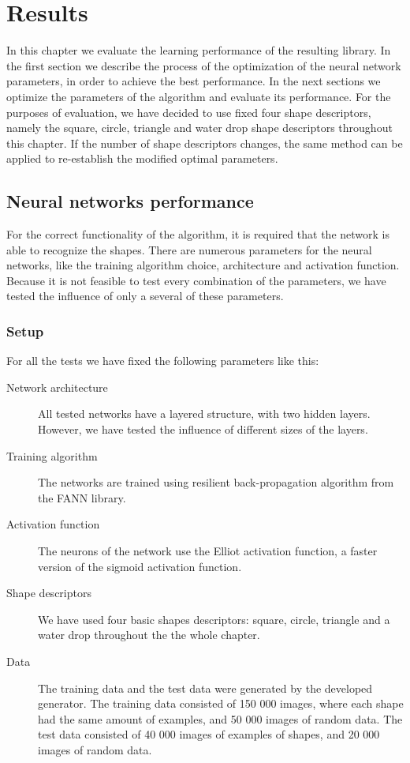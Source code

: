 \chapter{Results}
In this chapter we evaluate the learning performance of the resulting library. In the first section we describe the process of the optimization of the neural network parameters, in order to achieve the best performance. In the next sections we optimize the parameters of the algorithm and evaluate its performance. For the purposes of evaluation, we have decided to use fixed four shape descriptors, namely the square, circle, triangle and water drop shape descriptors throughout this chapter. If the number of shape descriptors changes, the same method can be applied to re-establish the modified optimal parameters.

\section{Neural networks performance}
For the correct functionality of the algorithm, it is required that the network is able to recognize the shapes. There are numerous parameters for the neural networks, like the training algorithm choice, architecture and activation function. Because it is not feasible to test every combination of the parameters, we have tested the influence of only a several of these parameters.

\subsection{Setup}
For all the tests we have fixed the following parameters like this:
\begin{description}
\item [Network architecture] All tested networks have a layered structure, with two hidden layers. However, we have tested the influence of different sizes of the layers.
\item [Training algorithm] The networks are trained using resilient back-propagation algorithm from the FANN library.
\item [Activation function] The neurons of the network use the Elliot activation function, a faster version of the sigmoid activation function.
\item [Shape descriptors] We have used four basic shapes descriptors: square, circle, triangle and a water drop throughout the the whole chapter. 
\item [Data] The training data and the test data were generated by the developed generator. The training data consisted of 150 000 images, where each shape had the same amount of examples, and 50 000 images of random data. The test data consisted of 40 000 images of examples of shapes, and 20 000 images of random data.
\end{description}

